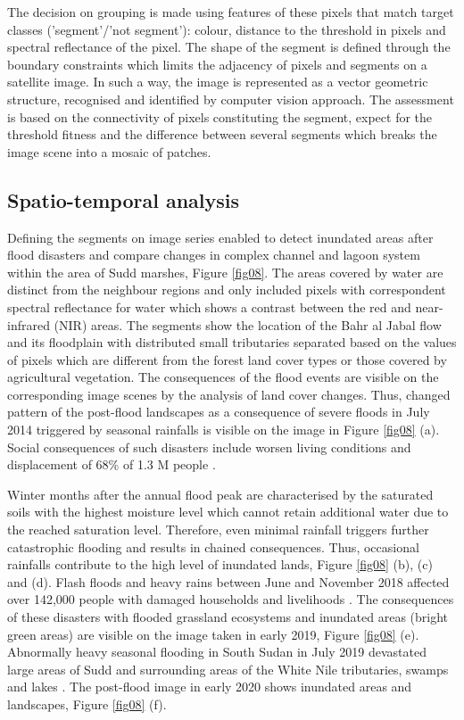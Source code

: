\documentclass[analytics,article,submit,pdftex,moreauthors]{Definitions/mdpi}
\begin{document}
The decision on grouping is made using features of these pixels that match target classes ('segment'/'not segment'): colour, distance to the threshold in pixels and spectral reflectance of the pixel. The shape of the segment is defined through the boundary constraints which limits the adjacency of pixels and segments on a satellite image. In such a way, the image is represented as a vector geometric structure, recognised and identified by computer vision approach. The assessment is based on the connectivity of pixels constituting the segment, expect for the threshold fitness and the difference between several segments which breaks the image scene into a mosaic of patches.

\subsection{Spatio-temporal analysis}

Defining the segments on image series enabled to detect inundated areas after flood disasters and compare changes in complex channel and lagoon system within the area of Sudd marshes, Figure \ref{fig08}. The areas covered by water are distinct from the neighbour regions and only included pixels with correspondent spectral reflectance for water which shows a contrast between the red and near-infrared (NIR) areas. The segments show the location of the Bahr al Jabal flow and its floodplain with distributed small tributaries separated based on the values of pixels which are different from the forest land cover types or those covered by agricultural vegetation. The consequences of the flood events are visible on the corresponding image scenes by the analysis of land cover changes. Thus, changed pattern of the post-flood landscapes as a consequence of severe floods in July 2014 triggered by seasonal rainfalls is visible on the image in Figure \ref{fig08} (a). Social consequences of such disasters include worsen living conditions and displacement of 68\% of 1.3 M people \cite{ReliefWeb2014}.  

Winter months after the annual flood peak are characterised by the saturated soils with the highest moisture level which cannot retain additional water due to the reached saturation level. Therefore, even minimal rainfall triggers further catastrophic flooding and results in chained consequences. Thus, occasional rainfalls contribute to the high level of inundated lands, Figure \ref{fig08} (b), (c) and (d). Flash floods and heavy rains between June and November 2018 affected over 142,000 people with damaged households and livelihoods \cite{ReliefWeb2018}. The consequences of these disasters with flooded grassland ecosystems and inundated areas (bright green areas) are visible on the image taken in early 2019, Figure \ref{fig08} (e). Abnormally heavy seasonal flooding in South Sudan in July 2019 devastated large areas of Sudd and surrounding areas of the White Nile tributaries, swamps and lakes \cite{OCHA2019}. The post-flood image in early 2020 shows inundated areas and landscapes, Figure \ref{fig08} (f).
\end{document}
